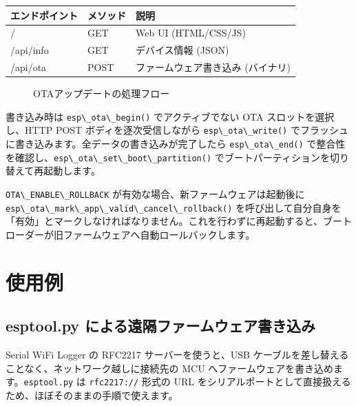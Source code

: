 \documentclass[10pt,twoside,openany,a4j]{ltjsbook}
\newcommand{\passthrough}[1]{#1}
\newcommand{\pandocbounded}[1]{#1}
\begin{document}
\begin{longtable}[]{@{}lll@{}}
\toprule\noalign{}
エンドポイント & メソッド & 説明 \\
\midrule\noalign{}
\endhead
\bottomrule\noalign{}
\endlastfoot
/ & GET & Web UI (HTML/CSS/JS) \\
/api/info & GET & デバイス情報 (JSON) \\
/api/ota & POST & ファームウェア書き込み (バイナリ) \\
\end{longtable}

\begin{figure}
\centering
\pandocbounded{}
\caption{OTAアップデートの処理フロー}\label{fig:ota_sequence}
\end{figure}

書き込み時は \passthrough{\lstinline!esp\_ota\_begin()!}
でアクティブでない OTA スロットを選択し、HTTP POST
ボディを逐次受信しながら \passthrough{\lstinline!esp\_ota\_write()!}
でフラッシュに書き込みます。全データの書き込みが完了したら
\passthrough{\lstinline!esp\_ota\_end()!}
で整合性を確認し、\passthrough{\lstinline!esp\_ota\_set\_boot\_partition()!}
でブートパーティションを切り替えて再起動します。

\passthrough{\lstinline!OTA\_ENABLE\_ROLLBACK!}
が有効な場合、新ファームウェアは起動後に
\passthrough{\lstinline!esp\_ota\_mark\_app\_valid\_cancel\_rollback()!}
を呼び出して自分自身を「有効」とマークしなければなりません。これを行わずに再起動すると、ブートローダーが旧ファームウェアへ自動ロールバックします。

\chapter{使用例}\label{ux4f7fux7528ux4f8b}

\section{esptool.py
による遠隔ファームウェア書き込み}\label{esptool.py-ux306bux3088ux308bux9060ux9694ux30d5ux30a1ux30fcux30e0ux30a6ux30a7ux30a2ux66f8ux304dux8fbcux307f}

Serial WiFi Logger の RFC2217 サーバーを使うと、USB
ケーブルを差し替えることなく、ネットワーク越しに接続先の MCU
へファームウェアを書き込めます。\passthrough{\lstinline!esptool.py!} は
\passthrough{\lstinline!rfc2217://!} 形式の URL
をシリアルポートとして直接扱えるため、ほぼそのままの手順で使えます。
\end{document}
